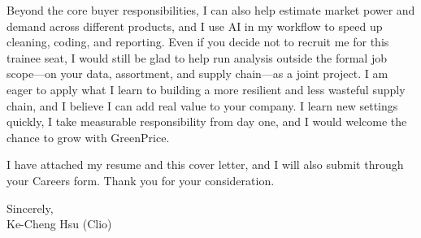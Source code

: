 \documentclass[11pt,letterpaper]{article}
\begin{document}
Beyond the core buyer responsibilities, I can also help estimate market power and demand across different products, and I use AI in my workflow to speed up cleaning, coding, and reporting. Even if you decide not to recruit me for this trainee seat, I would still be glad to help run analysis outside the formal job scope---on your data, assortment, and supply chain---as a joint project. I am eager to apply what I learn to building a more resilient and less wasteful supply chain, and I believe I can add real value to your company. I learn new settings quickly, I take measurable responsibility from day one, and I would welcome the chance to grow with GreenPrice.

I have attached my resume and this cover letter, and I will also submit through your Careers form. Thank you for your consideration.

\vspace{0.7em}
Sincerely,\\[1.0em]
Ke-Cheng Hsu (Clio)
\end{document}
